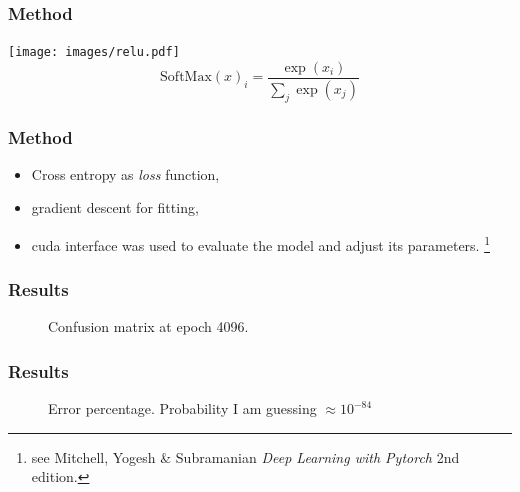 \documentclass{beamer}
\begin{document}
\begin{frame}
    \frametitle{Method}
        \vfill
        \pause
        
           \texttt{[image: images/relu.pdf]}\pause
           $$\mathrm{SoftMax}(x)_i = \frac{\exp(x_i)}{\sum_{j} \exp(x_j)}$$
\end{frame}
\begin{frame}
    \frametitle{Method}
    \begin{itemize}
        \item Cross entropy as \emph{loss} function,
        \item gradient descent for fitting,
        \item cuda interface was used to evaluate the model 
        and adjust its parameters.
    \footnote{see Mitchell, Yogesh \& Subramanian \emph{Deep Learning with Pytorch} 2nd edition.}
    \end{itemize}
\end{frame}

\begin{frame}
    \frametitle{Results}
    \begin{figure}
        \caption{Confusion matrix at epoch 4096.}
    \end{figure}
\end{frame}
\begin{frame}
    \frametitle{Results}
    \begin{figure}
        \caption{Error percentage. Probability I am guessing $\approx 10^{-84}$}
    \end{figure}
\end{frame}
\end{document}
